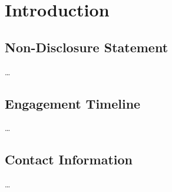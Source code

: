 \section{Introduction}
\subsection{Non-Disclosure Statement}
\dots
\subsection{Engagement Timeline}
\dots
\subsection{Contact Information}
\dots
